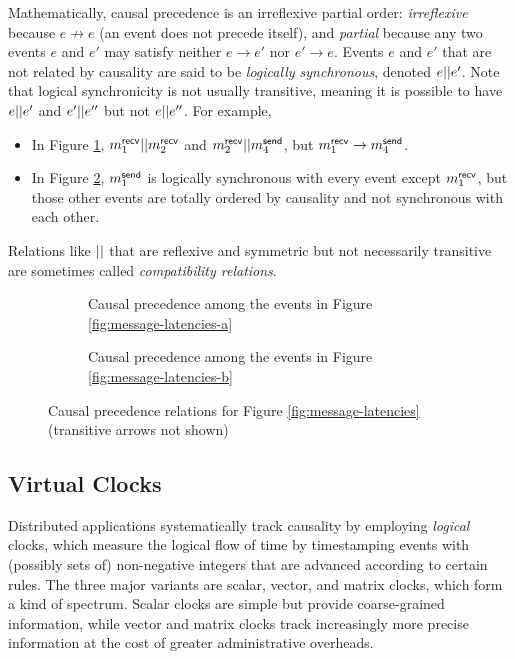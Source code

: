 \documentclass[]             %
{NASA}                       %
\theoremstyle{definition}
\begin{document}
Mathematically, causal precedence is an irreflexive partial order:
\emph{irreflexive} because $e \not \to e$ (an event does not precede
itself), and \emph{partial} because any two events $e$ and $e'$ may
satisfy neither $e \to e'$ nor $e' \to e$. Events $e$ and $e'$ that
are not related by causality are said to be \emph{logically
  synchronous}, denoted $e || e'$. Note that logical
synchronicity is not usually transitive, meaning it is possible to
have $e || e'$ and $e' || e''$ but not $e || e''$. For
example,
\begin{itemize}
\item In Figure \ref{fig:message-co-a}, $m_{1}^{\mathsf{recv}} || m_{2}^{\mathsf{recv}}$
  and $m_{2}^{\mathsf{recv}} || m_{4}^{\mathsf{send}}$, but $m_{1}^{\mathsf{recv}} \to m_{4}^{\mathsf{send}}$.
\item In Figure \ref{fig:message-co-b}, $m_{1}^{\mathsf{send}}$ is logically synchronous
with every event except $m_{1}^{\mathsf{recv}}$, but those other events are
totally ordered by causality and not synchronous with each
other.
\end{itemize}
Relations like $||$ that are reflexive and symmetric but not
necessarily transitive are sometimes called \emph{compatibility
  relations}.

\begin{figure}
  \begingroup
  \setlength\belowcaptionskip{4ex}
  \begin{subfigure}{1\textwidth}
    \centering
    
    \caption{Causal precedence among the events in Figure \ref{fig:message-latencies-a}}
    \label{fig:message-co-a}
  \end{subfigure}
  \endgroup
  \begin{subfigure}{1\textwidth}
    \centering
    
    \caption{Causal precedence among the events in Figure \ref{fig:message-latencies-b}}
    \label{fig:message-co-b}
  \end{subfigure}
  \caption{Causal precedence relations for Figure \ref{fig:message-latencies} (transitive arrows not shown)}
  \label{fig:causal-precedence}
\end{figure}

\subsection{Virtual Clocks}
\label{ssec:timestamps}
Distributed applications systematically track causality by employing
\emph{logical} clocks, which measure the logical flow of time by
timestamping events with (possibly sets of) non-negative integers that
are advanced according to certain rules. The three major variants are
scalar, vector, and matrix clocks, which form a kind of
spectrum. Scalar clocks are simple but provide coarse-grained
information, while vector and matrix clocks track increasingly more
precise information at the cost of greater administrative overheads.
\end{document}
